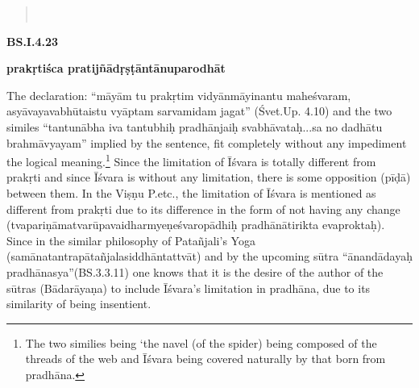 \newpage

\textbf{}

\begin{verse}
\\
\end{verse}



\textbf{BS.I.4.23}

\textbf{prakṛtiśca pratijñādṛṣṭāntānuparodhāt}

The  declaration: “māyām tu prakṛtim vidyānmāyinantu maheśvaram, asyāvayavabhūtaistu vyāptam sarvamidam jagat” (Śvet.Up. 4.10) and the two similes “tantunābha iva tantubhiḥ pradhānjaiḥ svabhāvataḥ...\-sa no dadhātu brahmāvyayam” implied by the sentence, fit completely without any impediment the logical meaning.\footnote{The two similies being ‘the navel (of the spider) being composed of the  threads  of the web and Īśvara being covered naturally by that born from pradhāna.} Since the limitation of Īśvara is totally different from prakṛti and since Īśvara is without any limitation, there is some opposition (pīḍā) between them. In the Viṣṇu P.etc., the limitation of Īśvara is mentioned as different from prakṛti due to its difference in the form of not having any change (tvapariṇāmatvarūpavaidharmyeṇeśvaropādhiḥ pradhānātirikta eva\break proktaḥ).  Since in the similar philosophy of Patañjali’s Yoga  (samānatantrapātañjalasiddhāntattvāt) and by the upcoming sūtra “ānandādayaḥ pradhānasya”(BS.3.3.11) one knows that it is the desire of the author of the sūtras (Bādarāyaṇa) to include Īśvara’s limitation in pradhāna, due to its similarity of being insentient.

